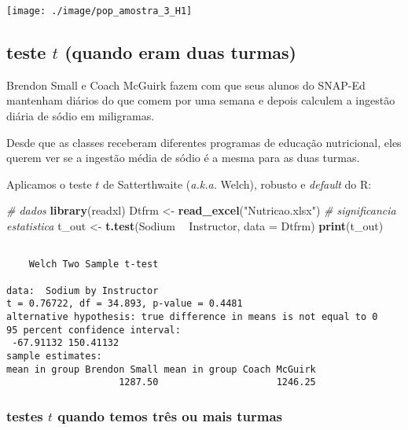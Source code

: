 \documentclass[]{article}
\newenvironment{Shaded}{\begin{snugshade}}{\end{snugshade}}
\newcommand{\KeywordTok}[1]{\textcolor[rgb]{0.13,0.29,0.53}{\textbf{#1}}}
\newcommand{\DataTypeTok}[1]{\textcolor[rgb]{0.13,0.29,0.53}{#1}}
\newcommand{\StringTok}[1]{\textcolor[rgb]{0.31,0.60,0.02}{#1}}
\newcommand{\CommentTok}[1]{\textcolor[rgb]{0.56,0.35,0.01}{\textit{#1}}}
\newcommand{\OperatorTok}[1]{\textcolor[rgb]{0.81,0.36,0.00}{\textbf{#1}}}
\newcommand{\NormalTok}[1]{#1}
\begin{document}
\begin{center}\texttt{[image: ./image/pop\_amostra\_3\_H1]} \end{center}

\subsection{\texorpdfstring{teste \(t\) (quando eram duas
turmas)}{teste t (quando eram duas turmas)}}\label{teste-t-quando-eram-duas-turmas}

Brendon Small e Coach McGuirk fazem com que seus alunos do SNAP-Ed
mantenham diários do que comem por uma semana e depois calculem a
ingestão diária de sódio em miligramas.

Desde que as classes receberam diferentes programas de educação
nutricional, eles querem ver se a ingestão média de sódio é a mesma para
as duas turmas.

Aplicamos o teste \(t\) de Satterthwaite (\emph{a.k.a.} Welch), robusto
e \emph{default} do R:

\begin{Shaded}
\begin{Highlighting}[]
\CommentTok{# dados}
\KeywordTok{library}\NormalTok{(readxl)}
\NormalTok{Dtfrm <-}\StringTok{ }\KeywordTok{read_excel}\NormalTok{(}\StringTok{"Nutricao.xlsx"}\NormalTok{)}
\CommentTok{# significancia estatistica}
\NormalTok{t_out <-}\StringTok{ }\KeywordTok{t.test}\NormalTok{(Sodium }\OperatorTok{~}\StringTok{ }\NormalTok{Instructor, }\DataTypeTok{data =}\NormalTok{ Dtfrm)}
\KeywordTok{print}\NormalTok{(t_out)}
\end{Highlighting}
\end{Shaded}

\begin{verbatim}

    Welch Two Sample t-test

data:  Sodium by Instructor
t = 0.76722, df = 34.893, p-value = 0.4481
alternative hypothesis: true difference in means is not equal to 0
95 percent confidence interval:
 -67.91132 150.41132
sample estimates:
mean in group Brendon Small mean in group Coach McGuirk 
                    1287.50                     1246.25 
\end{verbatim}

\subsubsection{\texorpdfstring{testes \(t\) quando temos três ou mais
turmas}{testes t quando temos três ou mais turmas}}\label{testes-t-quando-temos-tres-ou-mais-turmas}
\end{document}
